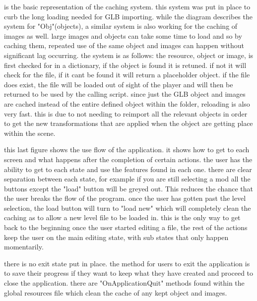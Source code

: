  is the basic representation of the caching system. this system was put in place to curb the long loading needed for GLB importing. while the diagram describes the system for "Obj"(objects), a similar system is also working for the caching of images as well. large images and objects can take some time to load and so by caching them, repeated use of the same object and images can happen without significant lag occurring.
the system is as follows: the resource, object or image, is first checked for in a dictionary, if the object is found it is retuned. if not it will check for the file, if it cant be found it will return a placeholder object. if the file does exist, the file will be loaded out of sight of the player and will then be returned to be used by the calling script. 
since just the GLB object and images are cached instead of the entire defined object within the folder, reloading is also very fast. this is due to not needing to reimport all the relevant objects in order to get the new transformations that are applied when the object are getting place within the scene.

this last figure  shows the use flow of the application. it shows how to get to each screen and what happens after the completion of certain actions. the user has the ability to get to each state and use the features found in each one. there are clear separation between each state, for example if you are still selecting a mod  all the buttons except the "load" button will be greyed out. This reduces the chance that the user breaks the flow of the program. once the user has gotten past the level selection, the load button will turn to "load new" which will completely clean the caching as to allow a new level file to be loaded in. this is the only way to get back to the beginning once the user started editing a file, the rest of the actions keep the user on the main editing state, with sub states that only happen momentarily.

there is no exit state put in place. the method for users to exit the application is to save their progress if they want to keep what they have created and proceed to close the application. there are "OnApplicationQuit" methods found within the global resources file which clean the cache of any kept object and images. 


